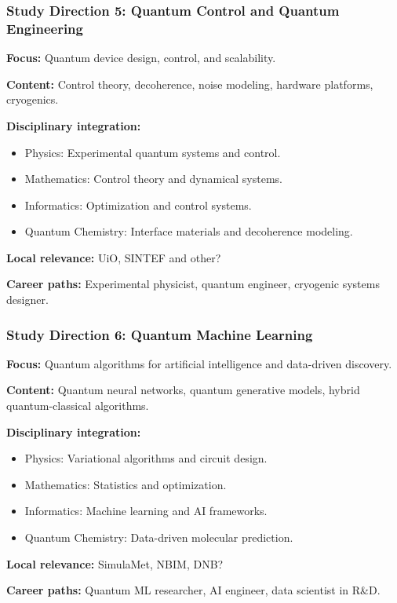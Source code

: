 \documentclass{beamer}
\begin{document}
\begin{frame}
\frametitle{Study Direction 5: Quantum Control and Quantum Engineering}
\textbf{Focus:} Quantum device design, control, and scalability.

\textbf{Content:} Control theory, decoherence, noise modeling, hardware platforms, cryogenics.

\textbf{Disciplinary integration:}
\begin{itemize}
    \item Physics: Experimental quantum systems and control.
    \item Mathematics: Control theory and dynamical systems.
    \item Informatics: Optimization and control systems.
    \item Quantum Chemistry: Interface materials and decoherence modeling.
\end{itemize}

\textbf{Local relevance:} UiO, SINTEF and other?

\textbf{Career paths:} Experimental physicist, quantum engineer, cryogenic systems designer.

\end{frame}


\begin{frame}
\frametitle{Study Direction 6: Quantum Machine Learning}
\textbf{Focus:} Quantum algorithms for artificial intelligence and data-driven discovery.

\textbf{Content:} Quantum neural networks, quantum generative models, hybrid quantum-classical algorithms.

\textbf{Disciplinary integration:}
\begin{itemize}
    \item Physics: Variational algorithms and circuit design.
    \item Mathematics: Statistics and optimization.
    \item Informatics: Machine learning and AI frameworks.
    \item Quantum Chemistry: Data-driven molecular prediction.
\end{itemize}

\textbf{Local relevance:} SimulaMet, NBIM, DNB?

\textbf{Career paths:} Quantum ML researcher, AI engineer, data scientist in R\&D.

\end{frame}
\end{document}

